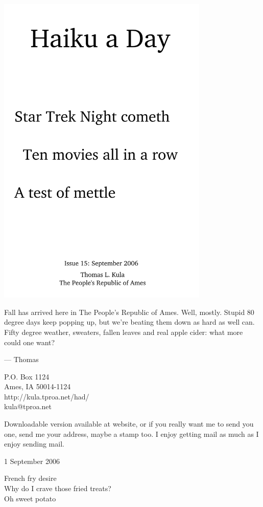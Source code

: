 \documentclass[12pt]{article}
\begin{document}
\includegraphics[width=101mm]{frontpage.png}

\newpage

Fall has arrived here in The People's Republic of Ames. Well,
mostly. Stupid 80 degree days keep popping up, but we're
beating them down as hard as well can. Fifty degree weather,
sweaters, fallen leaves and real apple cider: what more could
one want?

--- Thomas

P.O. Box 1124 \\
Ames, IA 50014-1124 \\
http://kula.tproa.net/had/ \\
kula@tproa.net

Downloadable version available at website, or if you really
want me to send you one, send me your address, maybe a
stamp too. I enjoy getting mail as much as I enjoy sending
mail.\\

\setlength{\parskip}{1mm}


\newpage

1 September 2006

French fry desire \\
Why do I crave those fried treats? \\
Oh sweet potato
\end{document}
